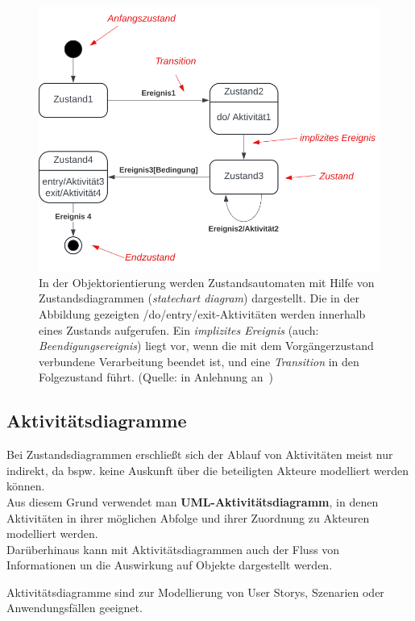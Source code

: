 \begin{figure}
    \centering
    \includegraphics[scale=0.4]{part two/Objektorientierte Analyse/img/statediagram}
    \caption{In der Objektorientierung werden Zustandsautomaten mit Hilfe von Zustandsdiagrammen (\textit{statechart diagram}) dargestellt. Die in der Abbildung gezeigten /do/entry/exit-Aktivitäten werden innerhalb eines Zustands aufgerufen. Ein \textit{implizites Ereignis} (auch: \textit{Beendigungsereignis}) liegt vor, wenn die mit dem Vorgängerzustand verbundene Verarbeitung beendet ist, und eine \textit{Transition} in den Folgezustand führt. (Quelle: in Anlehnung an~\cite[90, Abb. 2.11-6]{Bal05})}
    \label{fig:statediagram}
\end{figure}

\subsection*{Aktivitätsdiagramme}
Bei Zustandsdiagrammen erschließt sich der Ablauf von Aktivitäten meist nur indirekt, da bspw. keine Auskunft über die beteiligten Akteure modelliert werden können.\\

\noindent
Aus diesem Grund verwendet man \textbf{UML-Aktivitätsdiagramm}, in denen Aktivitäten in ihrer möglichen Abfolge und ihrer Zuordnung zu Akteuren modelliert werden.\\

\noindent
Darüberhinaus kann mit Aktivitätsdiagrammen  auch der Fluss von Informationen un die Auswirkung auf Objekte dargestellt werden.\\

\vspace{2mm}
\begin{tcolorbox}
Aktivitätsdiagramme sind zur Modellierung von User Storys, Szenarien oder Anwendungsfällen geeignet.
\end{tcolorbox}
\vspace{2mm}